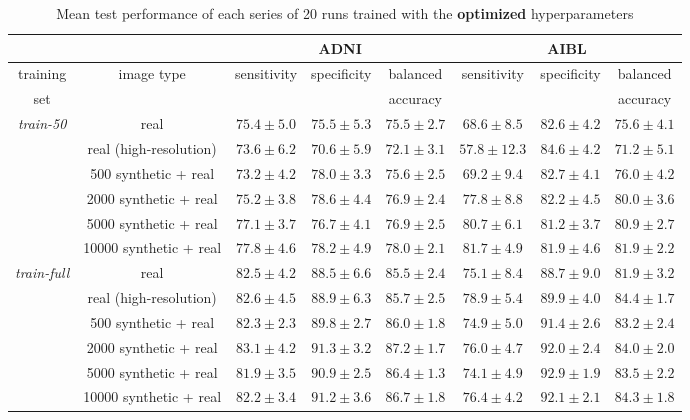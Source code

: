 \documentclass[10pt,journal,compsoc]{IEEEtran}
\begin{document}
\begin{table*}
 \caption{Mean test performance of each series of 20 runs trained with the \textbf{optimized} hyperparameters}
 \label{table: perf_optimized}
\centering
\scriptsize
  \begin{tabular}{|c|c||c|c|c||c|c|c|}
    \cline{3-8}
    \multicolumn{2}{c|}{} & \multicolumn{3}{c||}{ADNI} & \multicolumn{3}{c|}{AIBL} \\
    \hline
    training & \multirow{2}{*}{image type} & \multirow{2}{*}{sensitivity} & \multirow{2}{*}{specificity} & balanced & \multirow{2}{*}{sensitivity} & \multirow{2}{*}{specificity} & balanced\\
    set & & & & accuracy & & & accuracy\\
    \hline
    \hline
    \multirow{6}{*}{\textit{train-50}} & real & $75.4\pm5.0$ & $75.5\pm5.3$ & $75.5\pm2.7$ & $68.6\pm8.5$ & $82.6\pm4.2$ & $75.6\pm4.1$ \\
    & real (high-resolution) & $73.6\pm6.2$ & $70.6\pm5.9$ & $72.1\pm3.1$ & $57.8\pm12.3$ & $84.6\pm4.2$ & $71.2\pm5.1$ \\
    \cline{2-8}
    & 500 synthetic + real & $73.2\pm4.2$ & $78.0\pm3.3$ & $75.6\pm2.5$ & $69.2\pm9.4$ & $\boldsymbol{82.7\pm4.1}$ & $76.0\pm4.2$ \\
    & 2000 synthetic + real & $75.2\pm3.8$ & $\boldsymbol{78.6\pm4.4}$ & $76.9\pm2.4$ & $77.8\pm8.8$ & $82.2\pm4.5$ & $80.0\pm3.6$ \\
    & 5000 synthetic + real & $77.1\pm3.7$ & $76.7\pm4.1$ & $76.9\pm2.5$ & $80.7\pm6.1$ & $81.2\pm3.7$ & $80.9\pm2.7$ \\
    & 10000 synthetic + real & $\boldsymbol{77.8\pm4.6}$ & $78.2\pm4.9$ & $\boldsymbol{78.0\pm2.1}$ & $\boldsymbol{81.7\pm4.9}$ & $81.9\pm4.6$ & $\boldsymbol{81.9\pm2.2}$ \\
    \hline
    \hline
    \multirow{6}{*}{\textit{train-full}} & real & $82.5\pm4.2$ & $88.5\pm6.6$ & $85.5\pm2.4$ & $75.1\pm8.4$ & $88.7\pm9.0$ & $81.9\pm3.2$ \\
    & real (high-resolution) & $82.6\pm4.5$ & $88.9\pm6.3$ & $85.7\pm2.5$ & $78.9\pm5.4$ & $89.9\pm4.0$ & $84.4\pm1.7$ \\
    \cline{2-8}
    & 500 synthetic + real & $82.3\pm2.3$ & $89.8\pm2.7$ & $86.0\pm1.8$ & $74.9\pm5.0$ & $91.4\pm2.6$ & $83.2\pm2.4$ \\
    & 2000 synthetic + real & $\boldsymbol{83.1\pm4.2}$ & $\boldsymbol{91.3\pm3.2}$ & $\boldsymbol{87.2\pm1.7}$ & $76.0\pm4.7$ & $92.0\pm2.4$ & $84.0\pm2.0$ \\
    & 5000 synthetic + real & $81.9\pm3.5$ & $90.9\pm2.5$ & $86.4\pm1.3$ & $74.1\pm4.9$ & $\boldsymbol{92.9\pm1.9}$ & $83.5\pm2.2$ \\
    & 10000 synthetic + real & $82.2\pm3.4$ & $91.2\pm3.6$ & $86.7\pm1.8$ & $\boldsymbol{76.4\pm4.2}$ & $92.1\pm2.1$ & $\boldsymbol{84.3\pm1.8}$ \\
    \hline
    
  \end{tabular}%
\end{table*}
\end{document}
